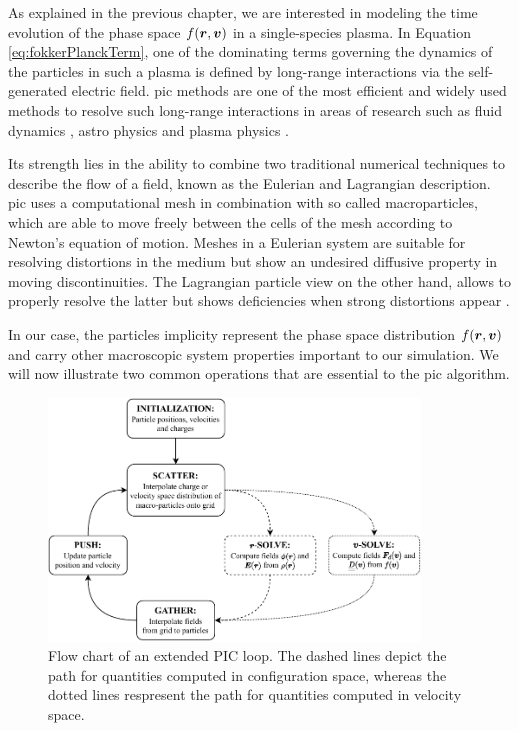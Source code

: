 As explained in the previous chapter, we are interested in modeling the time evolution of the phase
space $f(\boldsymbol{r},\boldsymbol{v})$ in a single-species plasma. 
In Equation \ref{eq:fokkerPlanckTerm}, one of the dominating terms governing the dynamics of
the particles in such a plasma is defined by long-range interactions via the self-generated electric field.
\gls{pic} methods are one of the most efficient and widely used methods to
resolve such long-range interactions in areas of research such as fluid dynamics
\cite{evans1957particle,harlow1964pic}, astro physics and plasma physics \cite{bunemanPIC,dawson1971Plasma}.

Its strength lies in the ability to combine two traditional numerical techniques to describe the
flow of a field, known as the Eulerian and Lagrangian description.
\gls{pic} uses a computational mesh in combination with so called macroparticles, which are able to move
freely between the cells of the mesh according to Newton's equation of motion.
Meshes in a Eulerian system are suitable for resolving distortions in the medium but show an undesired diffusive
property in moving discontinuities. The Lagrangian particle view on the other hand, allows to properly
resolve the latter but shows deficiencies when strong distortions appear \cite{harlow1987picprogeny}.

In our case, the particles implicity represent the phase space distribution $f(\boldsymbol{r},\boldsymbol{v})$
and carry other macroscopic system properties important to our simulation.
We will now illustrate two common operations that are essential to the \gls{pic} algorithm.

\begin{figure}[h]
    \begin{center}
        \includegraphics[width=0.88\textwidth]{figures/computational_model/PIC_loops_bw.pdf}
    \end{center}
    \caption{Flow chart of an extended PIC loop. The dashed lines depict the path for quantities computed in
    configuration space, whereas the dotted lines respresent the path for quantities computed in
velocity space.}
    \label{fig:PICloops}
\end{figure}

